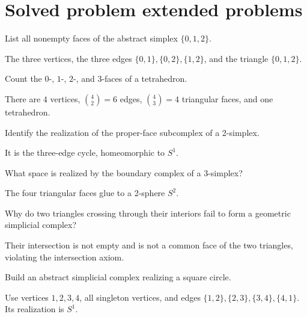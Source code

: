 \section{Solved problem extended problems}

\begin{problem}\label{prob:viii15-01}
List all nonempty faces of the abstract simplex \(\{0,1,2\}\).
\end{problem}
\begin{solution}
The three vertices, the three edges \(\{0,1\},\{0,2\},\{1,2\}\), and the triangle \(\{0,1,2\}\).
\end{solution}

\begin{problem}\label{prob:viii15-02}
Count the \(0\)-, \(1\)-, \(2\)-, and \(3\)-faces of a tetrahedron.
\end{problem}
\begin{solution}
There are \(4\) vertices, \(\binom42=6\) edges, \(\binom43=4\) triangular faces, and one tetrahedron.
\end{solution}

\begin{problem}\label{prob:viii15-03}
Identify the realization of the proper-face subcomplex of a 2-simplex.
\end{problem}
\begin{solution}
It is the three-edge cycle, homeomorphic to \(S^1\).
\end{solution}

\begin{problem}\label{prob:viii15-04}
What space is realized by the boundary complex of a 3-simplex?
\end{problem}
\begin{solution}
The four triangular faces glue to a 2-sphere \(S^2\).
\end{solution}

\begin{problem}\label{prob:viii15-05}
Why do two triangles crossing through their interiors fail to form a geometric simplicial complex?
\end{problem}
\begin{solution}
Their intersection is not empty and is not a common face of the two triangles, violating the intersection axiom.
\end{solution}

\begin{problem}\label{prob:viii15-06}
Build an abstract simplicial complex realizing a square circle.
\end{problem}
\begin{solution}
Use vertices \(1,2,3,4\), all singleton vertices, and edges \(\{1,2\},\{2,3\},\{3,4\},\{4,1\}\). Its realization is \(S^1\).
\end{solution}

